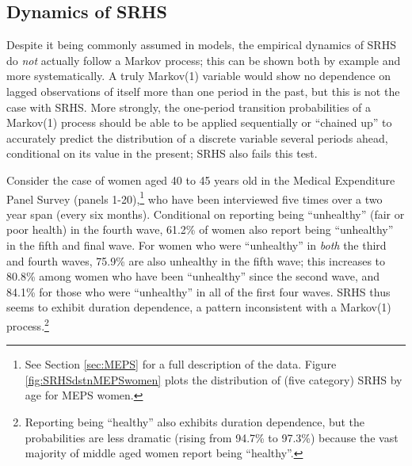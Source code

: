 \documentclass[12pt,pdftex,letterpaper]{article}
\begin{document}
\subsection{Dynamics of SRHS}

Despite it being commonly assumed in models, the empirical dynamics of SRHS do \textit{not} actually follow a Markov process; this can be shown both by example and more systematically.  A truly Markov(1) variable would show no dependence on lagged observations of itself more than one period in the past, but this is not the case with SRHS.  More strongly, the one-period transition probabilities of a Markov(1) process should be able to be applied sequentially or ``chained up'' to accurately predict the distribution of a discrete variable several periods ahead, conditional on its value in the present; SRHS also fails this test.

Consider the case of women aged 40 to 45 years old in the Medical Expenditure Panel Survey (panels 1-20),\footnote{See Section \ref{sec:MEPS} for a full description of the data.  Figure \ref{fig:SRHSdstnMEPSwomen} plots the distribution of (five category) SRHS by age for MEPS women.} who have been interviewed five times over a two year span (every six months).  Conditional on reporting being ``unhealthy'' (fair or poor health) in the fourth wave, 61.2\% of women also report being ``unhealthy'' in the fifth and final wave.  For women who were ``unhealthy'' in \textit{both} the third and fourth waves, 75.9\% are also unhealthy in the fifth wave; this increases to 80.8\% among women who have been ``unhealthy'' since the second wave, and 84.1\% for those who were ``unhealthy'' in all of the first four waves.  SRHS thus seems to exhibit duration dependence, a pattern inconsistent with a Markov(1) process.\footnote{Reporting being  ``healthy'' also exhibits duration dependence, but the probabilities are less dramatic (rising from 94.7\% to 97.3\%) because the vast majority of middle aged women report being ``healthy''.}
\end{document}
